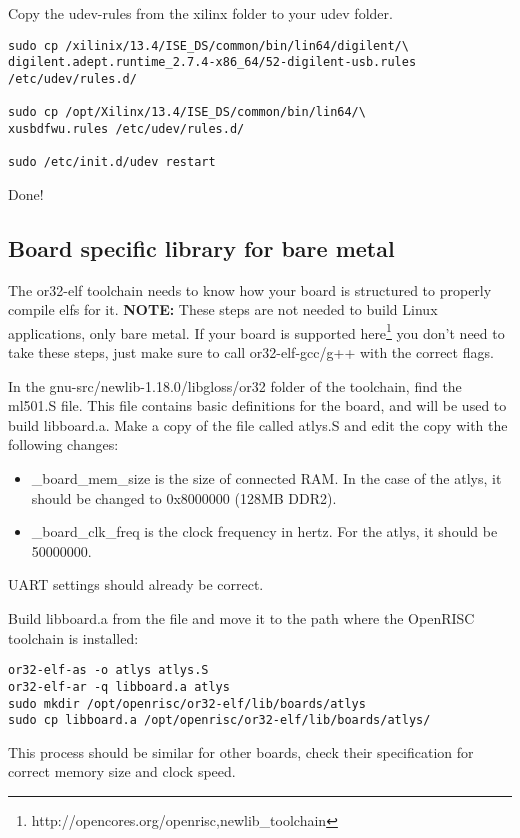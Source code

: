 \documentclass[10pt,a4paper]{article}
\begin{document}
Copy the udev-rules from the xilinx folder to your udev folder.

\begin{lstlisting}
sudo cp /xilinix/13.4/ISE_DS/common/bin/lin64/digilent/\
digilent.adept.runtime_2.7.4-x86_64/52-digilent-usb.rules /etc/udev/rules.d/

sudo cp /opt/Xilinx/13.4/ISE_DS/common/bin/lin64/\
xusbdfwu.rules /etc/udev/rules.d/

sudo /etc/init.d/udev restart
\end{lstlisting}
Done!

\subsection{Board specific library for bare metal}
\label{sec:libboard}
The or32-elf toolchain needs to know how your board is structured to properly compile elfs for it. \textbf{NOTE:} These steps are not needed to build Linux applications, only bare metal. If your board is supported here\footnote{http://opencores.org/openrisc,newlib\_toolchain} you don't need to take these steps, just make sure to call or32-elf-gcc/g++ with the correct flags.

In the gnu-src/newlib-1.18.0/libgloss/or32 folder of the toolchain, find the ml501.S file. This file contains basic definitions for the board, and will be used to build libboard.a. Make a copy of the file called atlys.S and edit the copy with the following changes:

\begin{itemize}
\item \_board\_mem\_size is the size of connected RAM. In the case of the atlys, it should be changed to 0x8000000 (128MB DDR2).
\item \_board\_clk\_freq is the clock frequency in hertz. For the atlys, it should be 50000000.
\end{itemize}

UART settings should already be correct.

Build libboard.a from the file and move it to the path where the OpenRISC toolchain is installed:

\begin{lstlisting}
or32-elf-as -o atlys atlys.S
or32-elf-ar -q libboard.a atlys
sudo mkdir /opt/openrisc/or32-elf/lib/boards/atlys
sudo cp libboard.a /opt/openrisc/or32-elf/lib/boards/atlys/
\end{lstlisting}

This process should be similar for other boards, check their specification for correct memory size and clock speed.
\end{document}
